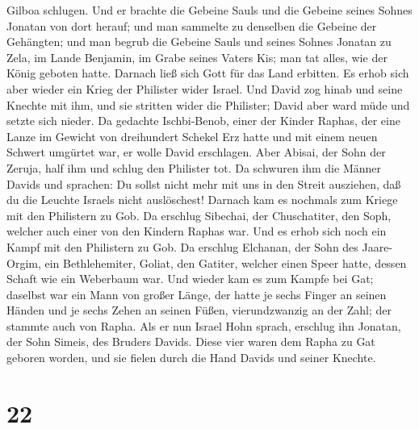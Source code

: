 Gilboa schlugen.  Und er brachte die Gebeine Sauls und
die Gebeine seines Sohnes Jonatan von dort herauf; und man sammelte zu
denselben die Gebeine der Gehängten;  und man begrub die
Gebeine Sauls und seines Sohnes Jonatan zu Zela, im Lande Benjamin, im
Grabe seines Vaters Kis; man tat alles, wie der König geboten hatte.
Darnach ließ sich Gott für das Land erbitten.  Es erhob
sich aber wieder ein Krieg der Philister wider Israel. Und David zog
hinab und seine Knechte mit ihm, und sie stritten wider die Philister;
David aber ward müde und setzte sich nieder. Da gedachte Ischbi-Benob,
 einer der Kinder Raphas, der eine Lanze im Gewicht von
dreihundert Schekel Erz hatte und mit einem neuen Schwert umgürtet war,
er wolle David erschlagen.  Aber Abisai, der Sohn der
Zeruja, half ihm und schlug den Philister tot. Da schwuren ihm die
Männer Davids und sprachen: Du sollst nicht mehr mit uns in den Streit
ausziehen, daß du die Leuchte Israels nicht auslöschest! 
Darnach kam es nochmals zum Kriege mit den Philistern zu Gob. Da
erschlug Sibechai, der Chuschatiter, den Soph, welcher auch einer von
den Kindern Raphas war.  Und es erhob sich noch ein Kampf
mit den Philistern zu Gob. Da erschlug Elchanan, der Sohn des
Jaare-Orgim, ein Bethlehemiter, Goliat, den Gatiter, welcher einen Speer
hatte, dessen Schaft wie ein Weberbaum war.  Und wieder
kam es zum Kampfe bei Gat; daselbst war ein Mann von großer Länge, der
hatte je sechs Finger an seinen Händen und je sechs Zehen an seinen
Füßen, vierundzwanzig an der Zahl; der stammte auch von Rapha.
 Als er nun Israel Hohn sprach, erschlug ihn Jonatan, der
Sohn Simeis, des Bruders Davids.  Diese vier waren dem
Rapha zu Gat geboren worden, und sie fielen durch die Hand Davids und
seiner Knechte.

\hypertarget{section-21}{%
\section{22}\label{section-21}}

